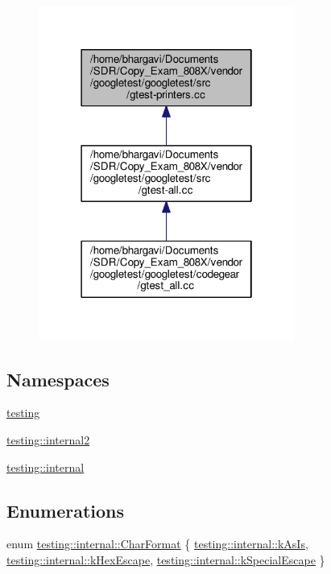 \begin{figure}[H]
\begin{center}
\leavevmode
\includegraphics[width=238pt]{gtest-printers_8cc__dep__incl}
\end{center}
\end{figure}
\subsection*{Namespaces}
\begin{DoxyCompactItemize}
\item 
 \hyperlink{namespacetesting}{testing}
\item 
 \hyperlink{namespacetesting_1_1internal2}{testing\+::internal2}
\item 
 \hyperlink{namespacetesting_1_1internal}{testing\+::internal}
\end{DoxyCompactItemize}
\subsection*{Enumerations}
\begin{DoxyCompactItemize}
\item 
enum \hyperlink{namespacetesting_1_1internal_ae2ef98247c76a50cdc80ceb4a6c81793}{testing\+::internal\+::\+Char\+Format} \{ \hyperlink{namespacetesting_1_1internal_ae2ef98247c76a50cdc80ceb4a6c81793af7038866be92e9978360b831e376ffaa}{testing\+::internal\+::k\+As\+Is}, 
\hyperlink{namespacetesting_1_1internal_ae2ef98247c76a50cdc80ceb4a6c81793aebfa5293302338a8e8678744c103f113}{testing\+::internal\+::k\+Hex\+Escape}, 
\hyperlink{namespacetesting_1_1internal_ae2ef98247c76a50cdc80ceb4a6c81793ae1211108e9f35f891d9951da64794d03}{testing\+::internal\+::k\+Special\+Escape}
 \}
\end{DoxyCompactItemize}
